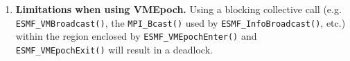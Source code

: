 \begin{enumerate}
\item {\bf Limitations when using VMEpoch.} Using a blocking collective call (e.g. {\tt ESMF\_VMBroadcast()}, the {\tt MPI\_Bcast()} used by {\tt ESMF\_InfoBroadcast()}, etc.) within the region enclosed by {\tt ESMF\_VMEpochEnter()} and {\tt ESMF\_VMEpochExit()} will result in a deadlock. 

  
\end{enumerate}


